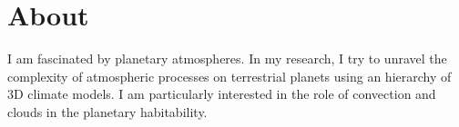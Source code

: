 \documentclass[a4paper, 11pt]{article}
\begin{document}
\keepXColumns  %




\section{About}
I am fascinated by planetary atmospheres. In my research, I try to unravel the complexity of atmospheric processes on terrestrial planets using an hierarchy of 3D climate models. I am particularly interested in the role of convection and clouds in the planetary habitability.

\end{document}
